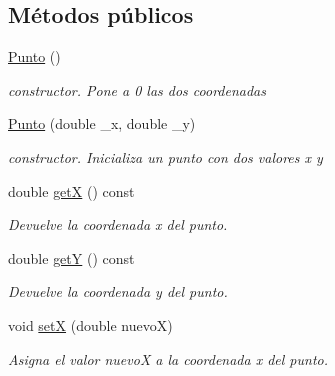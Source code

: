 \subsection*{Métodos públicos}
\begin{DoxyCompactItemize}
\item 
\mbox{\label{classPunto_a4b8b70b933ff13493ee5ddb3c8532c10}} 
\hyperlink{classPunto_a4b8b70b933ff13493ee5ddb3c8532c10}{Punto} ()
\begin{DoxyCompactList}\small\item\em constructor. Pone a 0 las dos coordenadas \end{DoxyCompactList}\item 
\mbox{\label{classPunto_a91b4238ec1ca3ddfb7b60b601a908d25}} 
\hyperlink{classPunto_a91b4238ec1ca3ddfb7b60b601a908d25}{Punto} (double \+\_\+x, double \+\_\+y)
\begin{DoxyCompactList}\small\item\em constructor. Inicializa un punto con dos valores x y \end{DoxyCompactList}\item 
\mbox{\label{classPunto_a0b37a2333238d01ed3125826261a9654}} 
double \hyperlink{classPunto_a0b37a2333238d01ed3125826261a9654}{getX} () const
\begin{DoxyCompactList}\small\item\em Devuelve la coordenada x del punto. \end{DoxyCompactList}\item 
\mbox{\label{classPunto_ad23e5570bd931af6f73ec0ede9511b27}} 
double \hyperlink{classPunto_ad23e5570bd931af6f73ec0ede9511b27}{getY} () const
\begin{DoxyCompactList}\small\item\em Devuelve la coordenada y del punto. \end{DoxyCompactList}\item 
\mbox{\label{classPunto_a51ae6616f828bb2b4111bc8ace49dbca}} 
void \hyperlink{classPunto_a51ae6616f828bb2b4111bc8ace49dbca}{setX} (double nuevoX)
\begin{DoxyCompactList}\small\item\em Asigna el valor nuevoX a la coordenada x del punto. \end{DoxyCompactList}\item 

\end{DoxyCompactItemize}
